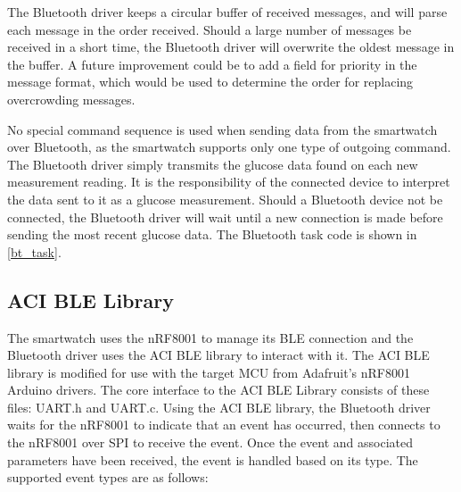 The Bluetooth driver keeps a circular buffer of received messages, and will parse each message in the order received. Should a large number of messages be received in a short time, the Bluetooth driver will overwrite the oldest message in the buffer. A future improvement could be to add a field for priority in the message format, which would be used to determine the order for replacing overcrowding messages.

No special command sequence is used when sending data from the smartwatch over Bluetooth, as the smartwatch supports only one type of outgoing command. The Bluetooth driver simply transmits the glucose data found on each new measurement reading. It is the responsibility of the connected device to interpret the data sent to it as a glucose measurement. Should a Bluetooth device not be connected, the Bluetooth driver will wait until a new connection is made before sending the most recent glucose data. The Bluetooth task code is shown in \ref{bt_task}.

\subsection{ACI BLE Library}
The smartwatch uses the nRF8001\cite{NRF8001} to manage its BLE connection and the Bluetooth driver uses the ACI BLE library to interact with it. The ACI BLE library is modified for use with the target MCU from Adafruit's nRF8001 Arduino drivers\cite{libaci}. The core interface to the ACI BLE Library consists of these files: UART.h and UART.c. Using the ACI BLE library, the Bluetooth driver waits for the nRF8001 to indicate that an event has occurred, then connects to the nRF8001 over SPI to receive the event. Once the event and associated parameters have been received, the event is handled based on its type. The supported event types are as follows:

